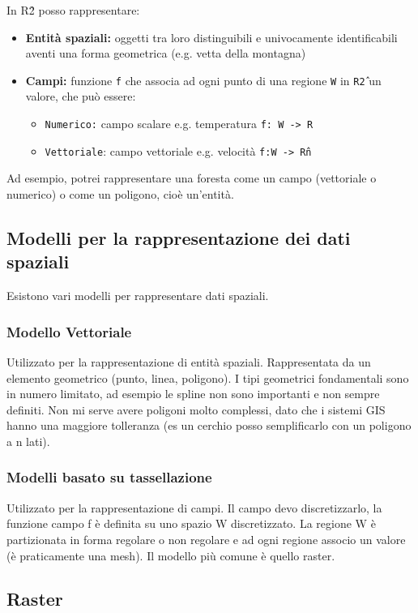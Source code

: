 \documentclass[a4paper,12pt]{article}
\begin{document}
In R\^2 posso rappresentare:
\begin{itemize}
\item \textbf{Entità spaziali:} oggetti tra loro distinguibili e univocamente identificabili aventi una forma geometrica (e.g. vetta della montagna) 
\item \textbf{Campi:} funzione \texttt{f} che associa ad ogni punto di una regione \texttt{W} in \texttt{R\^2} un valore, che può essere:
	\begin{itemize}
	\item \texttt{Numerico:} campo scalare e.g. temperatura \texttt{f: W -> R}
	\item \texttt{Vettoriale}: campo vettoriale e.g. velocità \texttt{f:W -> R\^n}
	\end{itemize}
\end{itemize}

Ad esempio, potrei rappresentare una foresta come un campo (vettoriale o numerico) o come un poligono, cioè un'entità.

\subsection{Modelli per la rappresentazione dei dati spaziali}
Esistono vari modelli per rappresentare dati spaziali.
\subsubsection{Modello Vettoriale}
Utilizzato per la rappresentazione di entità spaziali. Rappresentata da un elemento geometrico (punto, linea, poligono). I tipi geometrici fondamentali sono in numero limitato, ad esempio le spline non sono importanti e non sempre definiti. Non mi serve avere poligoni molto complessi, dato che i sistemi GIS hanno una maggiore tolleranza (es un cerchio posso semplificarlo con un poligono a n lati).


\subsubsection{Modelli basato su tassellazione}
Utilizzato per la rappresentazione di campi. Il campo devo discretizzarlo, la funzione campo f è definita su uno spazio W discretizzato. La regione W è partizionata in forma regolare o non regolare e ad ogni regione associo un valore (è praticamente una mesh). Il modello più comune è quello raster.

\subsection{Raster}
\end{document}
